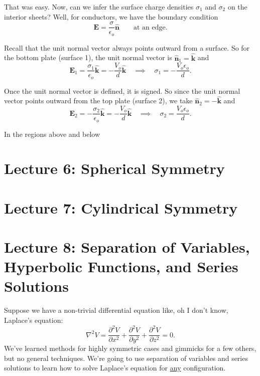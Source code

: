 \documentclass{article}
\numberwithin{equation}{section}
\newcommand{\khat}{\mathbf{\hat{k}}}
\newcommand{\nhat}{\mathbf{\hat{n}}}
\begin{document}
That was easy. Now, can we infer the surface charge densities $\sigma_1$ and $\sigma_2$ on the interior sheets? Well, for conductors, we have the boundary condition
\begin{equation*}
    \bm{E} = \frac{\sigma}{\epsilon_o} \nhat \qquad \text{at an edge.}
\end{equation*}

Recall that the unit normal vector always points outward from a surface. So for the bottom plate (surface 1), the unit normal vector is $\nhat_1 = \khat$ and
\begin{equation*}
    \bm{E}_1 = \frac{\sigma_1}{\epsilon_o} \khat = -\frac{V_o}{d} \khat \quad \implies \quad \sigma_1 = -\frac{V_o \epsilon_o}{d}.
\end{equation*}

Once the unit normal vector is defined, it is signed. So since the unit normal vector points outward from the top plate (surface 2), we take $\nhat_2 = -\khat$ and
\begin{equation*}
    \bm{E}_2 = -\frac{\sigma_2}{\epsilon_o} \khat = -\frac{V_o}{d}\khat \quad \implies \quad \sigma_2 = \frac{V_o \epsilon_o}{d}.
\end{equation*}

In the regions above and below


\newpage

\section*{Lecture 6: Spherical Symmetry}
\setcounter{page}{1}


\newpage

\section*{Lecture 7: Cylindrical Symmetry}
\setcounter{page}{1}


\newpage

\section*{Lecture 8: Separation of Variables, Hyperbolic Functions, and Series Solutions}
\setcounter{page}{1}

Suppose we have a non-trivial differential equation like, oh I don't know, Laplace's equation:
\begin{equation*}
    \nabla^2 V = \frac{\partial^2 V}{\partial x^2} + \frac{\partial^2 V}{\partial y^2} + \frac{\partial^2 V}{\partial z^2} = 0.
\end{equation*}
We've learned methods for highly symmetric cases and gimmicks for a few others, but no general techniques. We're going to use separation of variables and series solutions to learn how to solve Laplace's equation for \underline{any} configuration. \\
\end{document}

